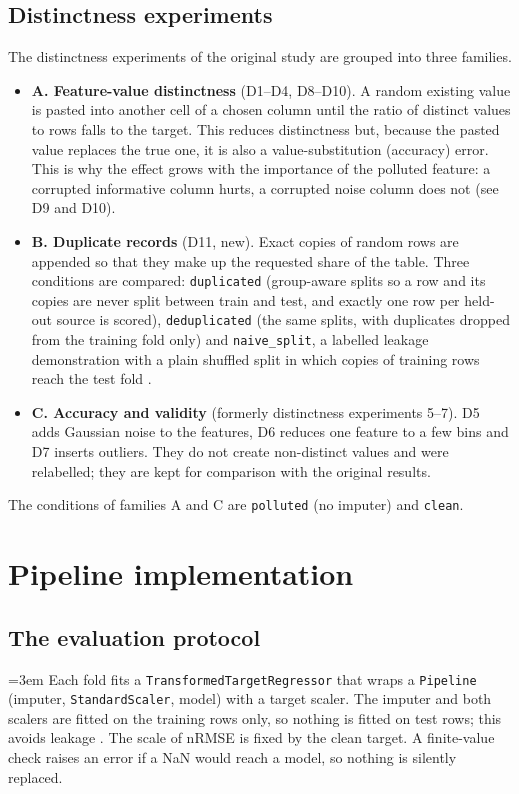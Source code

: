 \documentclass{Configuration_Files/PoliMi3i_thesis}
\begin{document}
\section{Distinctness experiments}
\label{sec:distinctness_exps}%
The distinctness experiments of the original study are grouped into three families.
\begin{itemize}
    \item \textbf{A. Feature-value distinctness} (D1--D4, D8--D10). A random existing value is pasted into another cell of a chosen column until the ratio of distinct values to rows falls to the target. This reduces distinctness but, because the pasted value replaces the true one, it is also a value-substitution (accuracy) error. This is why the effect grows with the importance of the polluted feature: a corrupted informative column hurts, a corrupted noise column does not (see D9 and D10).
    \item \textbf{B. Duplicate records} (D11, new). Exact copies of random rows are appended so that they make up the requested share of the table. Three conditions are compared: \texttt{duplicated} (group-aware splits so a row and its copies are never split between train and test, and exactly one row per held-out source is scored), \texttt{deduplicated} (the same splits, with duplicates dropped from the training fold only) and \texttt{naive\_split}, a labelled leakage demonstration with a plain shuffled split in which copies of training rows reach the test fold \citep{kaufman2012}.
    \item \textbf{C. Accuracy and validity} (formerly distinctness experiments 5--7). D5 adds Gaussian noise to the features, D6 reduces one feature to a few bins and D7 inserts outliers. They do not create non-distinct values and were relabelled; they are kept for comparison with the original results.
\end{itemize}
The conditions of families A and C are \texttt{polluted} (no imputer) and \texttt{clean}.

\chapter{Pipeline implementation}
\label{ch:chapter_3}%

\section{The evaluation protocol}
\label{sec:protocol}%
{\emergencystretch=3em Each fold fits a \texttt{Transformed\allowbreak Target\allowbreak Regressor} that wraps a \texttt{Pipeline} (imputer, \texttt{StandardScaler}, model) with a target scaler. The imputer and both scalers are fitted on the training rows only, so nothing is fitted on test rows; this avoids leakage \citep{kaufman2012}. The scale of nRMSE is fixed by the clean target. A finite-value check raises an error if a NaN would reach a model, so nothing is silently replaced.\par}
\end{document}
